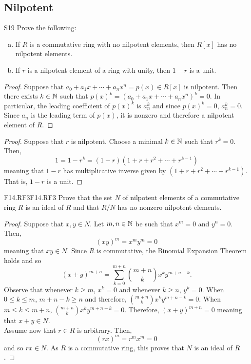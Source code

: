\documentclass[../AlgebraQualSolutions.tex]{subfiles}
\begin{document}
\subsection{Nilpotent}

\begin{prob}{S19}{}
	Prove the following:
	\begin{enumerate}[(a)]
	\item If $R$ is a commutative ring with no nilpotent elements, then $R[x]$ has no nilpotent elements.
	\item If $r$ is a nilpotent element of a ring with unity, then $1 - r$ is a unit.
	\end{enumerate}
	\end{prob}
	
	\begin{proof}
		Suppose that $a_0 + a_1 x + \cdots + a_nx^n = p(x) \in R[x]$ is nilpotent. Then there exists $k \in \mathbb{N}$ such that $p(x)^k = (a_0 + a_1 x + \cdots + a_nx^n)^k = 0$. In particular, the leading coefficient of $p(x)^k$ is $a_n^k$ and since $p(x)^k = 0$, $a_n^k = 0$. Since $a_n$ is the leading term of $p(x)$, it is nonzero and therefore a nilpotent element of $R$.
	\end{proof}
	
	\begin{proof}
		Suppose that $r$ is nilpotent. Choose a minimal $k \in \mathbb{N}$ such that $r^k = 0$. Then,
			\[1 = 1 - r^k = (1-r)(1 + r + r^2 + \cdots + r^{k-1})\]
		meaning that $1-r$ has multiplicative inverse given by $(1 + r + r^2 + \cdots + r^{k-1})$. That is, $1-r$ is a unit.
	\end{proof}

\begin{prob}{F14.RF3}{F14.RF3}
	Prove that the set $N$ of nilpotent elements of a commutative ring $R$ is an ideal of $R$ and that $R/N$ has no nonzero nilpotent elements.
\end{prob}

\begin{proof}
	Suppose that $x,y \in N$. Let $m,n \in \mathbb{N}$ be such that $x^m = 0$ and $y^n = 0$. Then,
		\[(xy)^m = x^my^m = 0 \]
	meaning that $xy \in N$. Since $R$ is commutative, the Binomial Expansion Theorem holds and so
		\[(x + y)^{m+n} = \sum_{k=0}^{m+n} {{m+n}\choose{k}}x^ky^{m+n - k}.\]
	Observe that whenever $k \geq m$, $x^k = 0$ and whenever $k \geq n$, $y^k = 0$. When $0 \leq k \leq m$, $m + n - k \geq n$ and therefore, ${{m+n}\choose{k}}x^ky^{m+n - k} = 0$. When $m \leq k \leq m+n$, ${{m+n}\choose{k}}x^ky^{m+n - k} = 0$. Therefore, $(x+y)^{m+n} = 0$ meaning that $x + y \in N$.\\

	Assume now that $r \in R$ is arbitrary. Then,
		\[(rx)^m = r^mx^m = 0\]
	and so $rx \in N$. As $R$ is a commutative ring, this proves that $N$ is an ideal of $R$.
\end{proof}
\end{document}
